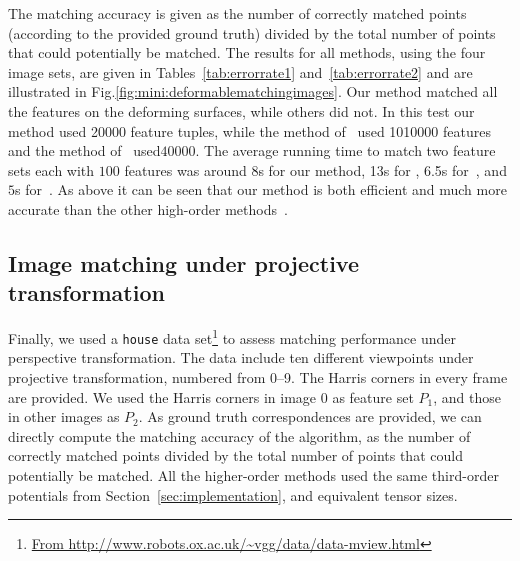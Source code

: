 The matching accuracy is given as the number of correctly matched points (according to the provided ground truth) divided by the total number of points that could potentially be matched. The results for all methods, using the four image sets, are given in Tables~\ref{tab:errorrate1} and~\ref{tab:errorrate2} and are illustrated in Fig.\ref{fig:mini:deformablematchingimages}. Our method matched all the features on the deforming surfaces, while others did not.
In this test our method used 20000 feature tuples, while the method of~\cite{Duchenne_etal09} used 1010000 features  and the method of~\cite{Zass08} used$40000$. The average running time to match two feature sets each with $100$ features was around 8s for our method, 13s for \cite{Duchenne_etal09}, 6.5s for~\cite{Zass08}, and $5$s for~\cite{Cour06}. As above it can be seen that our method is both efficient and much more accurate than the other high-order methods~\cite{Zass08,Duchenne_etal09}.

\subsection{Image matching under projective transformation}
\label{subsec:projectivedata}

Finally, we used a \texttt{house} data set\footnote{\url{From http://www.robots.ox.ac.uk/~vgg/data/data-mview.html}} to assess matching performance under perspective transformation. The data include ten different viewpoints under projective transformation, numbered from 0--9. The Harris corners in every frame are provided. We used the Harris corners in image 0 as feature set $P_1$, and those in other images as $P_2$. As ground truth correspondences are provided, we can directly compute the matching accuracy of the algorithm, as the number of correctly matched points divided by the total number of points that could potentially be matched.
All the higher-order methods used the same third-order potentials from Section~\ref{sec:implementation}, and equivalent tensor sizes.

